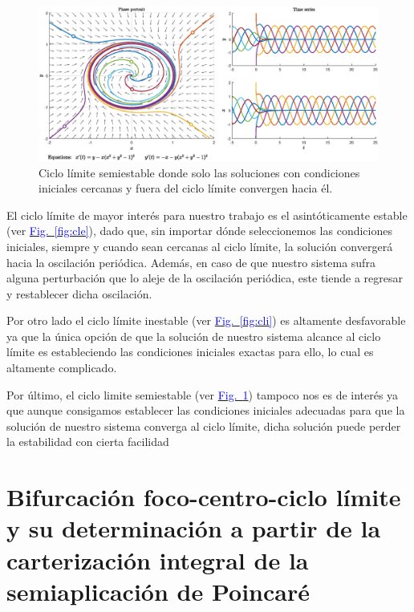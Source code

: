 \documentclass[12pt,a4paper]{report} %
\newcommand{\fref}[1]{\hyperref[#1]{\textcolor{blue}{Fig.~\ref*{#1}}}}
\newcommand{\fref}[1]{\hyperref[#1]{\textcolor{blue}{\textit{Fig.~\ref*{#1}}}}}
\begin{document}
	\begin{figure}[h]
		\centering
		\includegraphics[width=1\textwidth]{clpe.eps}
		\caption{Ciclo límite semiestable donde solo las soluciones con condiciones iniciales cercanas y fuera del ciclo límite convergen hacia él.}
		\label{fig:clpe}
	\end{figure}\smallskip
	
	\vspace{0.5cm} El ciclo límite de mayor interés para nuestro trabajo es el asintóticamente estable (ver \fref{fig:cle}), dado que, sin importar dónde seleccionemos las condiciones iniciales, siempre y cuando sean cercanas al ciclo límite, la solución convergerá hacia la oscilación periódica. Además, en caso de que nuestro sistema sufra alguna perturbación que lo aleje de la oscilación periódica, este tiende a regresar y restablecer dicha oscilación.
	
	\vspace{0.5cm}Por otro lado el ciclo límite inestable (ver \fref{fig:cli}) es altamente desfavorable ya que la única opción de que la solución de nuestro sistema alcance al ciclo límite es estableciendo las condiciones iniciales exactas para ello, lo cual es altamente complicado.
	
	\vspace{0.5cm} Por último, el ciclo limite semiestable (ver \fref{fig:clpe}) tampoco nos es de interés ya que aunque consigamos establecer las condiciones iniciales adecuadas para que la solución de nuestro sistema converga al ciclo límite, dicha solución puede perder la estabilidad con cierta facilidad
	
	\newpage
	
	\section{Bifurcación foco-centro-ciclo límite y su determinación a partir de la carterización integral de la semiaplicación de Poincaré}
	
\end{document}
